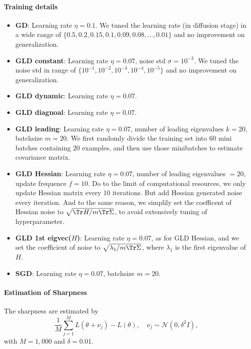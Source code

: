\documentclass{article}
\begin{document}
\paragraph{Training details}
\begin{itemize}
    \item \textbf{GD}: Learning rate $\eta=0.1$. We tuned the learning rate (in diffusion stage) in a wide range of $\{0.5, 0.2, 0.15, 0.1, 0.09, 0.08, \dots, 0.01\}$ and no improvement on generalization.
    \item \textbf{GLD constant}: Learning rate $\eta=0.07$, noise std $\sigma=10^{-3}$. We tuned the noise std in range of $\{10^{-1}, 10^{-2}, 10^{-3}, 10^{-4}, 10^{-5}\}$ and no improvement on generalization.
    \item \textbf{GLD dynamic}: Learning rate $\eta=0.07$.
    \item \textbf{GLD diagnoal}: Learning rate $\eta=0.07$.
    \item \textbf{GLD leading}: Learning rate $\eta=0.07$, number of leading eigenvalues $k=20$, batchsize $m=20$. We first randomly divide the training set into $60$ mini batches containing $20$ examples, and then use those minibatches to estimate covariance matrix.
    \item \textbf{GLD Hessian}: Learning rate $\eta=0.07$, number of leading eigenvalues $=20$, update frequence $f=10$. Do to the limit of computational resources, we only update Hessian matrix every $10$ iterations. But add Hessian generated noise every iteration. And to the same reason, we simplily set the coefficent of Hessian noise to $\sqrt{\Tr H / m\Tr \Sigma}$, to avoid extensively tuning of hyperparameter.
    \item \textbf{GLD 1st eigvec($H$)}: Learning rate $\eta = 0.07$, as for GLD Hessian, and we set the coefficient of noise to $\sqrt{\lambda_1 / m\Tr \Sigma}$, where $\lambda_1$ is the first eigenvalue of $H$.
    \item \textbf{SGD}: Learning rate $\eta=0.07$, batchsize $m=20$.
\end{itemize}

\paragraph{Estimation of Sharpness}
The sharpness are estimated by 
\begin{equation}
\frac{1}{M} \sum_{j=1}^M L(\theta+\nu_j) - L(\theta),\quad \nu_j \sim \mathcal{N}(0,\delta^2I),
\end{equation}
with $M=1,000$ and $\delta=0.01$.
\end{document}
